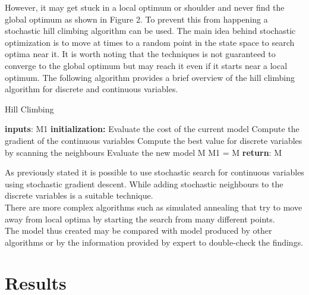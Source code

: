 \documentclass{article}
\begin{document}
However, it may get stuck in a local optimum or shoulder and never find the global optimum as shown in Figure 2. To prevent this from happening a stochastic hill climbing algorithm can be used. The main idea behind stochastic optimization is to move at times to a random point in the state space to search optima near it. It is worth noting that the techniques is not guaranteed to converge to the global optimum but may reach it even if it starts near a local optimum. The following algorithm provides a brief overview of the hill climbing algorithm for discrete and continuous variables.
\begin{algorithm} [H]
   \caption{Hill Climbing}
    \begin{algorithmic}[1]
        \State \textbf{inputs}: 
        \State M1 
            \State \textbf{initialization:}
            \Do
            \State Evaluate the cost of the current model
            \State Compute the gradient of the continuous variables
     	    \State Compute the best value for discrete variables by scanning the neighbours
     	    \State Evaluate the new model M
 				\State M1 = M
 		\EndIf
 \State \textbf{return}:  M
\end{algorithmic}
\end{algorithm}
As previously stated it is possible to use stochastic search for continuous variables using stochastic gradient descent. While adding stochastic neighbours to the discrete variables is a suitable technique. \\
There are more complex algorithms such as simulated annealing that try to move away from local optima by starting the search from many different points. \\
The model thus created may be compared with model produced by other algorithms or by the information provided by expert to double-check the findings. \\


\section{Results}
\end{document}
